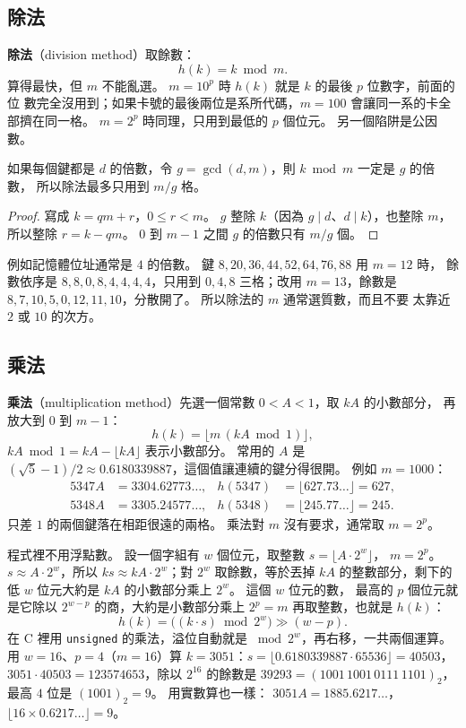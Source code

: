 \subsection{除法}

\textbf{除法}（division method）取餘數：
\[
h(k) = k \bmod m.
\]
算得最快，但 $m$ 不能亂選。 $m = 10^p$ 時 $h(k)$ 就是 $k$ 的最後 $p$ 位數字，前面的位
數完全沒用到；如果卡號的最後兩位是系所代碼，$m = 100$ 會讓同一系的卡全部擠在同一格。
$m = 2^p$ 時同理，只用到最低的 $p$ 個位元。 另一個陷阱是公因數。

\begin{lemma}
\label{lem:hash-gcd}
如果每個鍵都是 $d$ 的倍數，令 $g = \gcd(d, m)$，則 $k \bmod m$ 一定是 $g$ 的倍數，
所以除法最多只用到 $m/g$ 格。
\end{lemma}

\begin{proof}
寫成 $k = qm + r$，$0 \le r < m$。 $g$ 整除 $k$（因為 $g \mid d$、$d \mid k$），也整除
$m$，所以整除 $r = k - qm$。 $0$ 到 $m - 1$ 之間 $g$ 的倍數只有 $m/g$ 個。
\end{proof}

例如記憶體位址通常是 $4$ 的倍數。 鍵 $8, 20, 36, 44, 52, 64, 76, 88$ 用 $m = 12$ 時，
餘數依序是 $8, 8, 0, 8, 4, 4, 4, 4$，只用到 $0, 4, 8$ 三格；改用 $m = 13$，餘數是
$8, 7, 10, 5, 0, 12, 11, 10$，分散開了。 所以除法的 $m$ 通常選質數，而且不要
太靠近 $2$ 或 $10$ 的次方。

\subsection{乘法}

\textbf{乘法}（multiplication method）先選一個常數 $0 < A < 1$，取 $kA$ 的小數部分，
再放大到 $0$ 到 $m-1$：
\[
h(k) = \bigl\lfloor m \,( kA \bmod 1 ) \bigr\rfloor,
\]
$kA \bmod 1 = kA - \lfloor kA \rfloor$ 表示小數部分。 常用的 $A$ 是
$(\sqrt{5} - 1)/2 \approx 0.6180339887$，這個值讓連續的鍵分得很開。 例如 $m = 1000$：
\[
\begin{aligned}
5347 A &= 3304.62773\ldots, & h(5347) &= \lfloor 627.73\ldots \rfloor = 627, \\
5348 A &= 3305.24577\ldots, & h(5348) &= \lfloor 245.77\ldots \rfloor = 245.
\end{aligned}
\]
只差 $1$ 的兩個鍵落在相距很遠的兩格。 乘法對 $m$ 沒有要求，通常取 $m = 2^p$。

程式裡不用浮點數。 設一個字組有 $w$ 個位元，取整數 $s = \lfloor A \cdot 2^w \rfloor$，
$m = 2^p$。 $s \approx A \cdot 2^w$，所以 $ks \approx kA \cdot 2^w$；對 $2^w$ 取餘數，等於丟掉
$kA$ 的整數部分，剩下的低 $w$ 位元大約是 $kA$ 的小數部分乘上 $2^w$。 這個 $w$ 位元的數，
最高的 $p$ 個位元就是它除以 $2^{w-p}$ 的商，大約是小數部分乘上 $2^p = m$ 再取整數，也就是
$h(k)$：
\[
h(k) = \bigl( (k \cdot s) \bmod 2^w \bigr) \gg (w - p).
\]
在 C 裡用 \texttt{unsigned} 的乘法，溢位自動就是 $\bmod 2^w$，再右移，一共兩個運算。
用 $w = 16$、$p = 4$（$m = 16$）算 $k = 3051$：$s = \lfloor 0.6180339887 \cdot 65536
\rfloor = 40503$，$3051 \cdot 40503 = 123574653$，除以 $2^{16}$ 的餘數是
$39293 = (1001\,1001\,0111\,1101)_2$，最高 $4$ 位是 $(1001)_2 = 9$。 用實數算也一樣：
$3051A = 1885.6217\ldots$，$\lfloor 16 \times 0.6217\ldots \rfloor = 9$。

